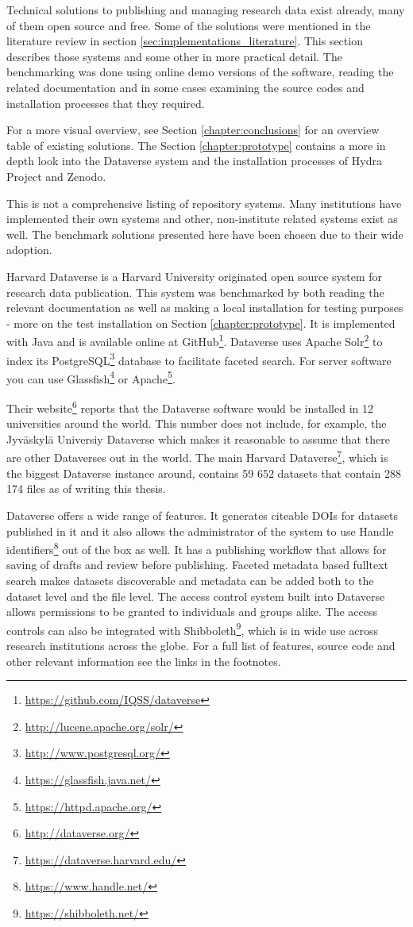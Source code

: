 Technical solutions to publishing and managing research data exist already, many
of them open source and free. Some of the solutions were mentioned in the
literature review in section \ref{sec:implementations_literature}. This section describes
those systems and some other in more practical detail. The benchmarking was
done using online demo versions of the software, reading the related
documentation and in some cases examining the source codes and installation
processes that they required.

For a more visual overview, see Section \ref{chapter:conclusions} for an
overview table of existing solutions. The Section \ref{chapter:prototype}
contains a more in depth look into the Dataverse system and the installation
processes of Hydra Project and Zenodo.

This is not a comprehensive listing of repository systems. Many institutions
have implemented their own systems and other, non-institute related systems
exist as well. The benchmark solutions presented here have been chosen due to
their wide adoption.

Harvard Dataverse is a Harvard University originated open source system
for research data publication. This system was benchmarked by both reading the
relevant documentation as well as making a local installation for testing
purposes - more on the test installation on Section \ref{chapter:prototype}.
It is implemented with Java and is available
online at GitHub\footnote{\url{https://github.com/IQSS/dataverse}}. Dataverse
uses Apache Solr\footnote{\url{http://lucene.apache.org/solr/}} to index its
PostgreSQL\footnote{\url{http://www.postgresql.org/}} database to facilitate
faceted search. For server software you can use Glassfish\footnote{\url{https://glassfish.java.net/}}
or Apache\footnote{\url{https://httpd.apache.org/}}.

Their website\footnote{\url{http://dataverse.org/}} reports that the Dataverse
software would be installed in 12 universities around the world. This
number does not include, for example, the Jyväskylä Universiy Dataverse which makes
it reasonable to assume that there are other Dataverses out in the world. The
main Harvard Dataverse\footnote{\url{https://dataverse.harvard.edu/}}, which
is the biggest Dataverse instance around, contains 59 652 datasets that contain
288 174 files as of writing this thesis.

Dataverse offers a wide range of features. It generates citeable DOIs for
datasets published in it and it also allows the administrator of the system
to use Handle identifiers\footnote{\url{https://www.handle.net/}} out of the
box as well. It has a publishing workflow that allows for saving of drafts and
review before publishing. Faceted metadata based fulltext search makes datasets
discoverable and metadata can be added both to the dataset level and the file
level. The access control system built into Dataverse allows permissions to be
granted to individuals and groups alike. The access controls can also be
integrated with Shibboleth\footnote{\url{https://shibboleth.net/}}, which is in
wide use across research institutions across the globe. For a full list of
features, source code and other relevant information see the links in the
footnotes.

